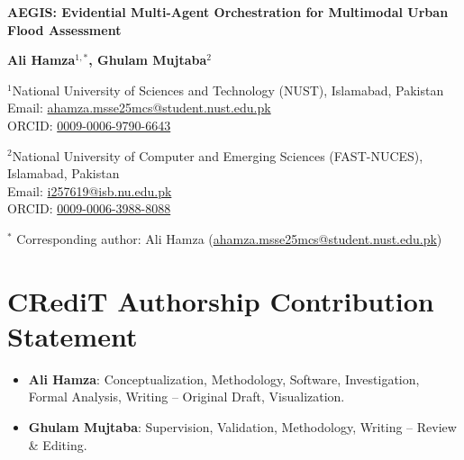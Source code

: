 \documentclass[11pt,a4paper]{article}
\begin{document}
\thispagestyle{empty}

\begin{center}
{\LARGE \bf AEGIS: Evidential Multi-Agent Orchestration for Multimodal Urban Flood Assessment \par}

\vspace{2em}

{\large \textbf{Ali Hamza$^{1,*}$, Ghulam Mujtaba$^2$} \par}

\vspace{1.5em}

$^1$National University of Sciences and Technology (NUST), Islamabad, Pakistan \\
Email: \href{mailto:ahamza.msse25mcs@student.nust.edu.pk}{ahamza.msse25mcs@student.nust.edu.pk} \\
ORCID: \href{https://orcid.org/0009-0006-9790-6643}{0009-0006-9790-6643}

\vspace{1em}

$^2$National University of Computer and Emerging Sciences (FAST-NUCES), Islamabad, Pakistan \\
Email: \href{mailto:i257619@isb.nu.edu.pk}{i257619@isb.nu.edu.pk} \\
ORCID: \href{https://orcid.org/0009-0006-3988-8088}{0009-0006-3988-8088}

\vspace{1.5em}

$^*$ Corresponding author: Ali Hamza (\href{mailto:ahamza.msse25mcs@student.nust.edu.pk}{ahamza.msse25mcs@student.nust.edu.pk})
\end{center}

\vspace{2em}

\section*{CRediT Authorship Contribution Statement}
\begin{itemize}
    \item \textbf{Ali Hamza}: Conceptualization, Methodology, Software, Investigation, Formal Analysis, Writing -- Original Draft, Visualization.
    \item \textbf{Ghulam Mujtaba}: Supervision, Validation, Methodology, Writing -- Review \& Editing.
\end{itemize}

\vspace{1.5em}
\end{document}
